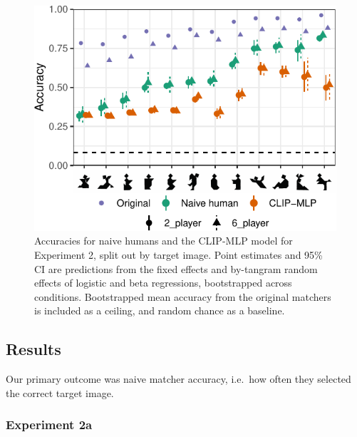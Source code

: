 \documentclass[10pt, letterpaper]{article}
\begin{document}
\begin{CodeChunk}
\begin{figure}[t]

{\centering \includegraphics[width=0.9\linewidth]{figs/fig-2-1} 

}

\caption[Accuracies for naive humans and the CLIP-MLP model for Experiment 2, split out by target image]{Accuracies for naive humans and the CLIP-MLP model for Experiment 2, split out by target image. Point estimates and 95\% CI are predictions from the fixed effects and by-tangram random effects of logistic and beta regressions, bootstrapped across conditions. Bootstrapped mean accuracy from the original matchers is included as a ceiling, and random chance as a baseline. \label{expt2-tangram}}\label{fig:fig-2}
\end{figure}
\end{CodeChunk}

\subsection{Results}\label{results-1}

Our primary outcome was naive matcher accuracy, i.e.~how often they
selected the correct target image.

\subsubsection{Experiment 2a}\label{experiment-2a-1}
\end{document}
